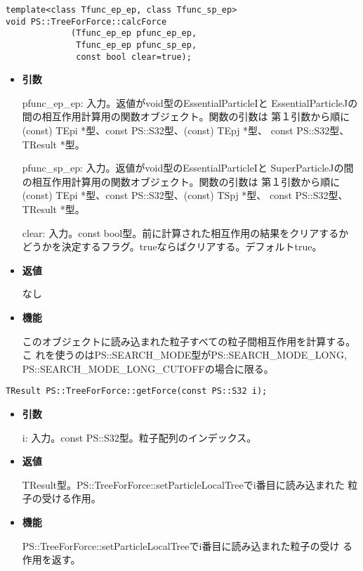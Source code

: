 \begin{screen}
\begin{verbatim}
template<class Tfunc_ep_ep, class Tfunc_sp_ep>
void PS::TreeForForce::calcForce
             (Tfunc_ep_ep pfunc_ep_ep,
              Tfunc_ep_ep pfunc_sp_ep,
              const bool clear=true);
\end{verbatim}
\end{screen}

\begin{itemize}

\item {\bf 引数}

pfunc\_ep\_ep: 入力。返値がvoid型のEssentialParticleIと
EssentialParticleJの間の相互作用計算用の関数オブジェクト。関数の引数は
第１引数から順に(const) TEpi *型、const PS::S32型、(const) TEpj *型、
const PS::S32型、TResult *型。

pfunc\_sp\_ep: 入力。返値がvoid型のEssentialParticleIと
SuperParticleJの間の相互作用計算用の関数オブジェクト。関数の引数は
第１引数から順に(const) TEpi *型、const PS::S32型、(const) TSpj *型、
const PS::S32型、TResult *型。

clear: 入力。const bool型。前に計算された相互作用の結果をクリアするか
どうかを決定するフラグ。trueならばクリアする。デフォルトtrue。

\item {\bf 返値}

なし

\item {\bf 機能}

このオブジェクトに読み込まれた粒子すべての粒子間相互作用を計算する。こ
れを使うのはPS::SEARCH\_MODE型がPS::SEARCH\_MODE\_LONG,\\
PS::SEARCH\_MODE\_LONG\_CUTOFFの場合に限る。

\end{itemize}


\begin{screen}
\begin{verbatim}
TResult PS::TreeForForce::getForce(const PS::S32 i);
\end{verbatim}
\end{screen}

\begin{itemize}

\item {\bf 引数}

i: 入力。const PS::S32型。粒子配列のインデックス。

\item {\bf 返値}

TResult型。PS::TreeForForce::setParticleLocalTreeでi番目に読み込まれた
粒子の受ける作用。

\item {\bf 機能}

PS::TreeForForce::setParticleLocalTreeでi番目に読み込まれた粒子の受け
る作用を返す。

\end{itemize}

